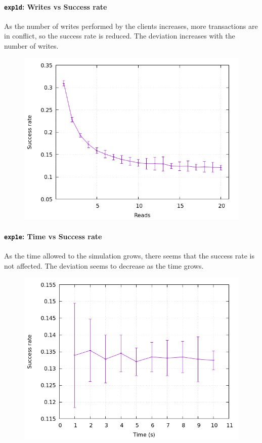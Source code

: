 \documentclass[a4paper, 11pt]{article}
\begin{document}
\paragraph{\texttt{exp1d}: Writes vs Success rate}

As the number of writes performed by the clients increases, more transactions 
are in conflict, so the success rate is reduced. The deviation increases with 
the number of writes.
\nopagebreak
\begin{figure}[H]
\centering
\includegraphics[width=.8\linewidth]{exp1/d/fig.png}
\end{figure}

\paragraph{\texttt{exp1e}: Time vs Success rate}

As the time allowed to the simulation grows, there seems that the success rate 
is not affected. The deviation seems to decrease as the time grows.
\nopagebreak
\begin{figure}[H]
\centering
\includegraphics[width=.8\linewidth]{exp1/e/fig.png}
\end{figure}
\end{document}

